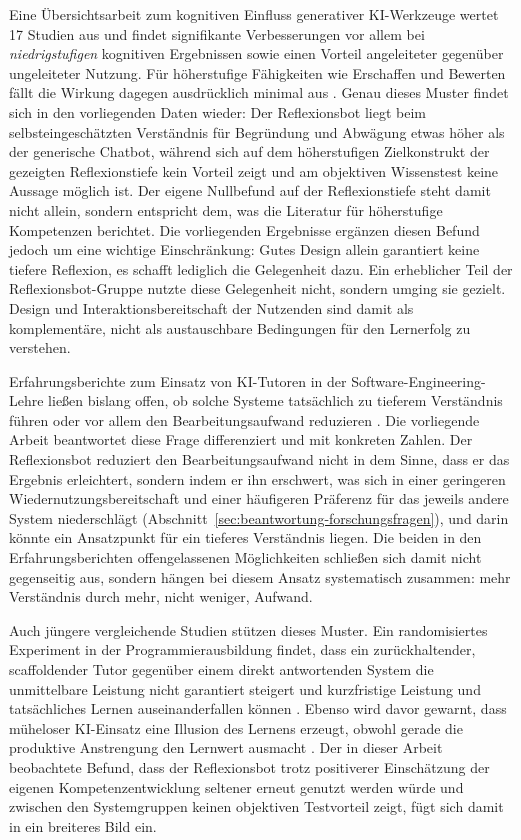 Eine Übersichtsarbeit zum kognitiven Einfluss generativer KI-Werkzeuge wertet 17 Studien aus und
findet signifikante Verbesserungen vor allem bei \emph{niedrigstufigen} kognitiven Ergebnissen sowie
einen Vorteil angeleiteter gegenüber ungeleiteter Nutzung. Für höherstufige Fähigkeiten wie Erschaffen
und Bewerten fällt die Wirkung dagegen ausdrücklich minimal aus \cite{GenerativeAITools}. Genau dieses
Muster findet sich in den vorliegenden Daten wieder: Der Reflexionsbot liegt beim selbsteingeschätzten
Verständnis für Begründung und Abwägung etwas höher als der generische Chatbot, während sich auf dem
höherstufigen Zielkonstrukt der gezeigten Reflexionstiefe kein Vorteil zeigt und am objektiven
Wissenstest keine Aussage möglich ist. Der eigene Nullbefund auf der Reflexionstiefe steht damit nicht
allein, sondern entspricht dem, was die Literatur für höherstufige Kompetenzen berichtet. Die
vorliegenden Ergebnisse ergänzen diesen Befund jedoch um eine wichtige
Einschränkung: Gutes Design allein garantiert keine tiefere Reflexion, es schafft lediglich die
Gelegenheit dazu. Ein erheblicher Teil der Reflexionsbot-Gruppe nutzte diese Gelegenheit nicht,
sondern umging sie gezielt. Design und Interaktionsbereitschaft der Nutzenden sind damit als
komplementäre, nicht als austauschbare Bedingungen für den Lernerfolg zu verstehen.

Erfahrungsberichte zum Einsatz von KI-Tutoren in der Software-Engineering-Lehre ließen bislang offen,
ob solche Systeme tatsächlich zu tieferem Verständnis führen oder vor allem den Bearbeitungsaufwand
reduzieren \cite{frankfordAITutoringSoftwareEngineering2024, happeExperienceReportPedagogically2025}.
Die vorliegende Arbeit beantwortet diese Frage differenziert und mit konkreten Zahlen. Der
Reflexionsbot reduziert den Bearbeitungsaufwand nicht in dem Sinne, dass er das Ergebnis erleichtert,
sondern indem er ihn erschwert, was sich in einer geringeren Wiedernutzungsbereitschaft und einer
häufigeren Präferenz für das jeweils andere System niederschlägt
(Abschnitt~\ref{sec:beantwortung-forschungsfragen}),
und darin könnte ein Ansatzpunkt für ein tieferes Verständnis liegen. Die beiden in den
Erfahrungsberichten offengelassenen Möglichkeiten schließen sich damit nicht gegenseitig aus,
sondern hängen bei diesem Ansatz systematisch zusammen: mehr Verständnis durch mehr, nicht weniger,
Aufwand.

Auch jüngere vergleichende Studien stützen dieses Muster. Ein randomisiertes Experiment in der
Programmierausbildung findet, dass ein zurückhaltender, scaffoldender Tutor gegenüber einem direkt
antwortenden System die unmittelbare Leistung nicht garantiert steigert und kurzfristige Leistung und
tatsächliches Lernen auseinanderfallen können \cite{bassnerLessStressBetter2026}. Ebenso wird davor
gewarnt, dass müheloser KI-Einsatz eine Illusion des Lernens erzeugt, obwohl gerade die produktive
Anstrengung den Lernwert ausmacht \cite{brcicEffortlessTrapProductive2026}. Der in dieser Arbeit
beobachtete Befund, dass der Reflexionsbot trotz positiverer Einschätzung der eigenen
Kompetenzentwicklung seltener erneut genutzt werden würde und zwischen den Systemgruppen keinen
objektiven Testvorteil zeigt, fügt sich damit in ein breiteres Bild ein.

